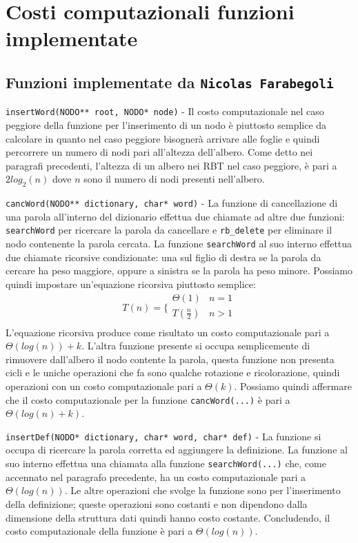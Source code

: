 \documentclass[paper=a4, fontsize=11pt,twoside]{scrartcl}   %
\begin{document}
		\section{Costi computazionali funzioni implementate}
			\subsection{Funzioni implementate da \texttt{Nicolas Farabegoli}}
				\texttt{insertWord(NODO** root, NODO* node)} - Il costo computazionale nel caso peggiore della funzione per l'inserimento di un nodo è piuttosto semplice da calcolare in quanto nel caso peggiore bisognerà arrivare alle foglie e quindi percorrere un numero di nodi pari all'altezza dell'albero. Come detto nei paragrafi precedenti, l'altezza di un albero nei RBT nel caso peggiore, è pari a $2log_2(n)$ dove $n$ sono il numero di nodi presenti nell'albero.\par
				
				\texttt{cancWord(NODO** dictionary, char* word)} - La funzione di cancellazione di una parola all'interno del dizionario effettua due chiamate ad altre due funzioni: \texttt{searchWord} per ricercare la parola da cancellare e \texttt{rb\_delete} per eliminare il nodo contenente la parola cercata. La funzione \texttt{searchWord} al suo interno effettua due chiamate ricorsive condizionate: una sul figlio di destra se la parola da cercare ha peso maggiore, oppure a sinistra se la parola ha peso minore. Possiamo quindi impostare un'equazione ricorsiva piuttosto semplice:				
				$$T(n) =
				\bigg \{
				\begin{array}{rl}
				\Theta(1) & n = 1 \\
				T(\frac{n}{2}) & n > 1 \\
				\end{array}
				$$
				L'equazione ricorsiva produce come risultato un costo computazionale pari a $\Theta(log(n)) + k$.
				L'altra funzione presente si occupa semplicemente di rimuovere dall'albero il nodo contente la parola, questa funzione non presenta cicli e le uniche operazioni che fa sono qualche rotazione e ricolorazione, quindi operazioni con un costo computazionale pari a $\Theta(k)$.
				Possiamo quindi affermare che il costo computazionale per la funzione \texttt{cancWord(...)} è pari a $\Theta(log(n) + k)$.\par
				
				\texttt{insertDef(NODO* dictionary, char* word, char* def)} - La funzione si occupa di ricercare la parola corretta ed aggiungere la definizione. La funzione al suo interno effettua una chiamata alla funzione \texttt{searchWord(...)} che, come accennato nel paragrafo precedente, ha un costo computazionale pari a $\Theta(log(n))$. Le altre operazioni che svolge la funzione sono per l'inserimento della definizione; queste operazioni sono costanti e non dipendono dalla dimensione della struttura dati quindi hanno costo costante. Concludendo, il costo computazionale della funzione è pari a $\Theta(log(n))$.\par
				
\end{document}
